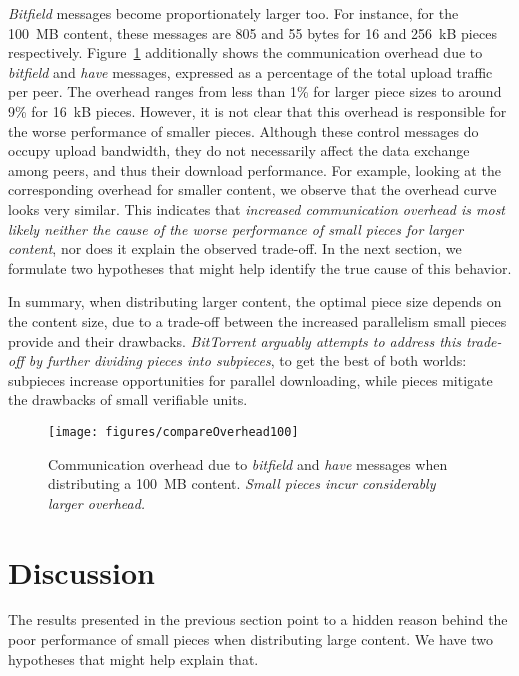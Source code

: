 \documentclass[twocolumn,letterpaper,11pt]{article}
\begin{document}
\textit{Bitfield} messages become proportionately larger too. For instance, 
for the 100~MB content, these messages are 805 and 55 bytes for 16 and 256~kB pieces 
respectively. Figure~\ref{fig:large_contents-overhead} additionally shows the communication overhead
due to \textit{bitfield} and \textit{have} messages, expressed as a percentage
of the total upload traffic per peer. The overhead ranges from less than 
1\% for larger
piece sizes to around 9\% for 16~kB pieces. However, it is not clear that this overhead
is responsible for the worse performance of smaller pieces.
Although these control messages do occupy upload bandwidth, they do not necessarily 
affect the data exchange among peers, and thus their download performance.
For example, looking at the corresponding overhead for smaller content, we observe that the overhead curve 
looks very similar. This indicates that \emph{increased communication
overhead is 
most likely neither the cause of the worse performance of small pieces for larger
content}, nor does it explain the observed trade-off. 
In the next section, we formulate two hypotheses that might 
help identify the true cause of this behavior.

In summary, when distributing larger content, the optimal 
piece size depends on the content size, due to a trade-off between 
the increased parallelism small pieces provide and their drawbacks.
\emph{BitTorrent arguably attempts to address this trade-off by further
dividing pieces into subpieces}, to get the best of both worlds: 
subpieces increase opportunities for parallel downloading, while pieces 
mitigate the drawbacks of small verifiable units.

\begin{figure}[t]
\centering
\texttt{[image: figures/compareOverhead100]}
\caption{Communication overhead due to \textit{bitfield} and \textit{have} messages 
when distributing a 100~MB content.
\emph{Small pieces incur considerably larger overhead.}}
\label{fig:large_contents-overhead}
\end{figure}

\section{Discussion}
\label{sec:discussion}

The results presented in the previous section point to a hidden reason behind
the poor performance of small pieces when distributing large content. We have
two hypotheses that might help explain that.
\end{document}
